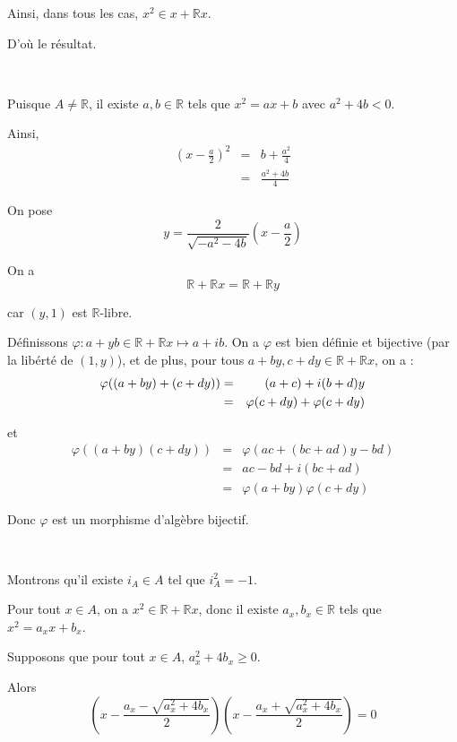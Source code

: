 Ainsi, dans tous les cas, $x^2 \in x +\mathbb{R}x$.

D'o{\`u} le r{\'e}sultat.

\

 Puisque $A \neq \mathbb{R}$, il existe $a, b \in \mathbb{R}$
tels que $x^2 = a x + b$ avec $a^2 + 4 b < 0$.

Ainsi,
\begin{eqnarray*}
  \left( x - \frac{a}{2} \right)^2 & = & b + \frac{a^2}{4}\\
  & = & \frac{a^2 + 4 b}{4}
\end{eqnarray*}


On pose
\[ y = \frac{2}{\sqrt{- a^2 - 4 b}} \left( x - \frac{a}{2} \right) \]


On a
\[ \mathbb{R}+\mathbb{R}x =\mathbb{R}+\mathbb{R}y \]


car $(y, 1)$ est $\mathbb{R}$-libre.

D{\'e}finissons $\varphi : a + y b \in \mathbb{R}+\mathbb{R}x \longmapsto a +
i b.$ On a $\varphi$ est bien d{\'e}finie et bijective (par la lib{\'e}rt{\'e}
de $(1, y)$), et de plus, pour tous $a + b y, c + d y \in
\mathbb{R}+\mathbb{R}x$, on a :
\begin{eqnarray*}
  \varphi ((a + b y) + (c + d y)) & = & (a + c) + i (b + d) y\\
  & = & \varphi (c + d y) + \varphi  (c + d y )
\end{eqnarray*}


et
\begin{eqnarray*}
  \varphi ((a + b y) (c + d y)) & = & \varphi (a c + (b c + a d) y - b d )\\
  & = & a c - b d + i (b c + a d)\\
  & = & \varphi (a + b y) \varphi (c + d y)
\end{eqnarray*}


Donc $\varphi$ est un morphisme d'alg{\`e}bre bijectif.

\

 Montrons qu'il existe $i_A \in A$ tel que $i^2_A = - 1$.

Pour tout $x \in A$, on a $x^2 \in \mathbb{R}+\mathbb{R}x$, donc il existe
$a_x, b_x \in \mathbb{R}$ tels que $x^2 = a_x x + b_x$.

Supposons que pour tout $x \in A$, $a_x^2 + 4 b_x \geqslant 0$.

Alors
\[ \left( x - \frac{a_x - \sqrt{a_x^2 + 4 b_x}}{2} \right) \left( x -
   \frac{a_x + \sqrt{a_x^2 + 4 b_x}}{2} \right) = 0 \]


